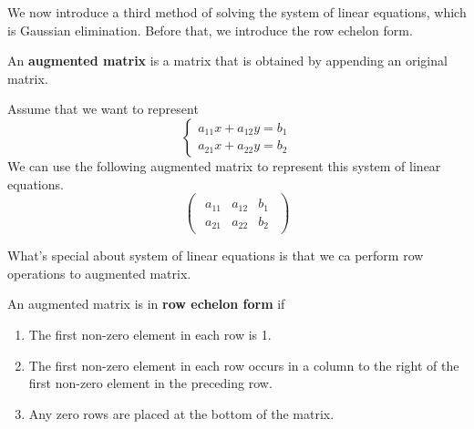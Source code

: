 \documentclass{huhtakm-template-book}
\begin{document}
We now introduce a third method of solving the system of linear equations, which is Gaussian elimination. Before that, we introduce the row echelon form.
\begin{defn}
    An \textbf{augmented matrix} is a matrix that is obtained by appending an original matrix.
\end{defn}
\begin{eg}
    Assume that we want to represent
    \begin{equation*}
        \begin{cases}
            a_{11}x+a_{12}y=b_{1}\\
            a_{21}x+a_{22}y=b_{2}
        \end{cases}
    \end{equation*}
    We can use the following augmented matrix to represent this system of linear equations.
    \begin{equation*}
        \begin{pmatrix}
            \begin{array}{cc|c}
                a_{11} & a_{12} & b_{1}\\
                a_{21} & a_{22} & b_{2}
            \end{array}  
        \end{pmatrix}
    \end{equation*}
\end{eg}
\begin{rem}
    What's special about system of linear equations is that we ca perform row operations to augmented matrix.
\end{rem}
\begin{defn}
    An augmented matrix is in \textbf{row echelon form} if
    \begin{enumerate}
        \item The first non-zero element in each row is 1.
        \item The first non-zero element in each row occurs in a column to the right of the first non-zero element in the preceding row.
        \item Any zero rows are placed at the bottom of the matrix.
    \end{enumerate}
\end{defn}
\end{document}
